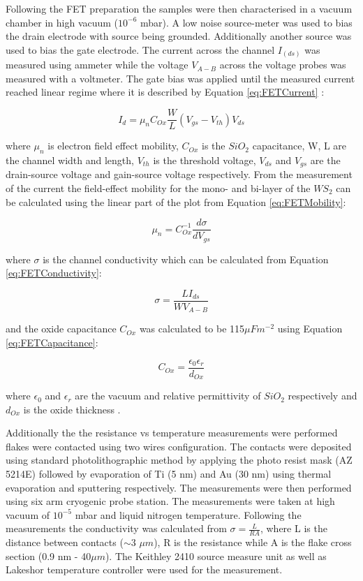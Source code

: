 Following the FET preparation the samples were then characterised in a vacuum chamber in high vacuum ($10^{-6}$ mbar). A low noise source-meter was used to bias the drain electrode with source being grounded. Additionally another source was used to bias the gate electrode. The current across the channel $I_(ds)$ was measured using ammeter while the voltage $V_{A-B}$ across the voltage probes was measured with a voltmeter. The gate bias was applied until the measured current reached linear regime where it is described by Equation \ref{eq:FETCurrent} \cite{Sze2006}: 

\begin{equation}
I_d = {\mu}_nC_{Ox}\frac{W}{L}(V_{gs} - V_{th})V_{ds}
\label{eq:FETCurrent}
\end{equation}

where ${\mu}_n$ is electron field effect mobility, $C_{Ox}$ is the $SiO_2$ capacitance, W, L are the channel width and length, $V_{th}$ is the threshold voltage, $V_{ds}$ and $V_{gs}$ are the drain-source voltage and gain-source voltage respectively. From the measurement of the current the field-effect mobility for the mono- and bi-layer of the $WS_2$ can be calculated using the linear part of the plot from Equation \ref{eq:FETMobility}: 

\begin{equation}
\mu_{n} = C_{Ox}^{-1}\frac{d{\sigma}}{dV_{gs}}
\label{eq:FETMobility}
\end{equation}

where $\sigma$ is the channel conductivity which can be calculated from Equation \ref{eq:FETConductivity}:

\begin{equation}
\sigma = \frac{LI_{ds}}{W V_{A-B}}
\label{eq:FETConductivity}
\end{equation}

and the oxide capacitance $C_{Ox}$ was calculated to be 115$\mu F m^{-2}$ using Equation \ref{eq:FETCapacitance}:

\begin{equation}
C_{Ox} = \frac{{\epsilon}_0{\epsilon}_r}{d_{Ox}}
\label{eq:FETCapacitance}
\end{equation}

where ${\epsilon}_0$ and ${\epsilon}_r$ are the vacuum and relative permittivity of $SiO_2$ respectively and $d_{Ox}$ is the oxide thickness \cite{Sze2006}.

Additionally the the resistance vs temperature measurements were performed flakes were contacted using two wires configuration. The contacts were deposited using standard photolithographic method by applying the photo resist mask (AZ 5214E) followed by evaporation of Ti (5 nm) and Au (30 nm) using thermal evaporation and sputtering respectively. The measurements were then performed using six arm cryogenic probe station. The measurements were taken at high vacuum of $10^{-5}$ mbar and liquid nitrogen temperature. Following the measurements the conductivity was calculated from $\sigma = \frac{L}{RA}$, where L is the distance between contacts ($\sim$3 $\mu m$), R is the resistance while A is the flake cross section (0.9 nm - 40$\mu m$). The Keithley 2410 source measure unit as well as Lakeshor temperature controller were used for the measurement.

